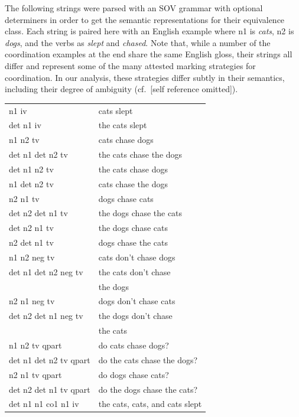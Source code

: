 \documentclass[11pt]{article}
\begin{document}
The following strings were parsed with an SOV grammar with
optional determiners in order to get the semantic representations
for their equivalence class.  Each string is paired here with an English
example where n1 is {\it cats}, n2 is {\it dogs}, and the verbs
as {\it slept} and {\it chased}.  Note that, while a number of the
coordination examples at the end share the same English gloss, their
strings all differ and represent some of the many attested marking
strategies for coordination.  In our analysis, these strategies differ
subtly in their semantics, including their degree of ambiguity (cf.~[self
reference omitted]).

\hspace{-15pt}
\begin{tabular}{ll}
n1 iv & cats slept\\
det n1 iv & the cats slept \\
n1 n2 tv & cats chase dogs\\
det n1 det n2 tv & the cats chase the dogs\\
det n1 n2 tv & the cats chase dogs\\
n1 det n2 tv & cats chase the dogs\\
n2 n1 tv & dogs chase cats\\
det n2 det n1 tv & the dogs chase the cats\\
det n2 n1 tv & the dogs chase cats\\
n2 det n1 tv & dogs chase the cats\\
n1 n2 neg tv & cats don't chase dogs\\
det n1 det n2 neg tv & the cats don't chase \\
 & \phantom{...}the dogs\\
n2 n1 neg tv & dogs don't chase cats\\
det n2 det n1 neg tv & the dogs don't chase \\
 & \phantom{...}the cats\\
n1 n2 tv qpart & do cats chase dogs?\\
det n1 det n2 tv qpart & do the cats chase the dogs?\\
n2 n1 tv qpart & do dogs chase cats?\\
det n2 det n1 tv qpart & do the dogs chase the cats?\\
det n1 n1 co1 n1 iv & the cats, cats, and cats slept\\
\end{tabular}
\end{document}
